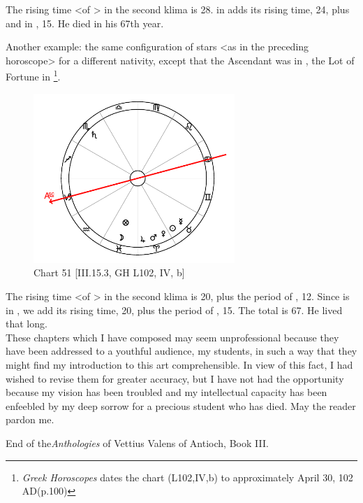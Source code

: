 The rising time <of \Gemini> in the second klima is 28. \Mercury\xspace in \Taurus\xspace adds its rising time, 24, plus \Mars\xspace and \Venus\xspace in \Aries, 15. He died in his 67th year.

\newpage
Another example: the same configuration of stars <as in the preceding horoscope> for a different nativity, except that the Ascendant was in \Capricorn, the Lot of Fortune in \Pisces
\footnote{\textit{Greek Horoscopes} dates the chart (L102,IV,b) to approximately April 30, 102 AD(p.100)}.

\clearpage
\begin{figure}
\centering
\vspace{-20pt}
\includegraphics[width=0.68\textwidth]{charts/3_15_3}
\caption{Chart 51 [III.15.3, GH L102, IV, b]}
\label{fig:chart51}
\end{figure} 

The rising time <of \Pisces> in the second klima is 20, plus the period of \Jupiter, 12. Since \Jupiter is in \Aries, we add its rising time, 20, plus the period of \Mars, 15. The total is 67. He lived that long. \\
\newline
\newline
These chapters which I have composed may seem unprofessional because they have been addressed to a youthful audience, my students, in such a way that they might find my introduction to this art comprehensible. In view of this fact, I had wished to revise them for greater accuracy, but I have not had the opportunity because my vision has been troubled and my intellectual capacity has been enfeebled by my deep sorrow for a precious student who has died. May the reader pardon me.

End of the\textit{Anthologies} of Vettius Valens of Antioch, Book III.

\newpage